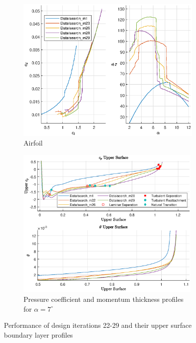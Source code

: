 \documentclass{article}
\begin{document}
\begin{figure}[H]
    \centering
    \begin{subfigure}{0.45\textwidth}
        \centering
        \includegraphics[width=1.2\textwidth, center]{figures/loRe_lod_29.eps}
        \caption{Airfoil}
        \label{fig:m29_lod}
    \end{subfigure}
    \begin{subfigure}{0.54\textwidth}
        \centering
        \includegraphics[width=0.99\textwidth]{figures/loRe_upperprofile_29_a5.eps}
        \caption{Pressure coefficient and momentum thickness profiles for $\alpha = 7^\circ$}
        \label{fig:m29_uprofile}
    \end{subfigure}
    \caption{Performance of design iterations 22-29 and their upper surface boundary layer profiles}
\end{figure}
\end{document}
